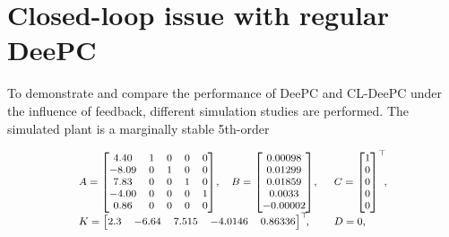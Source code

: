 \section{Closed-loop issue with regular \ac{DeePC}}\label{sec:CL_ID_issue}
To demonstrate and compare the performance of \ac{DeePC} and \ac{CL-DeePC} under the influence of feedback, different simulation studies are performed. The simulated plant is a marginally stable 5th-order 

\begin{align}\label{eq:SysFavoreel}
\scriptsize
\begin{array}{lll}
    A = \begin{bmatrix}
        4.40 & 1 & 0 & 0 & 0\\
       -8.09 & 0 & 1 & 0 & 0\\
        7.83 & 0 & 0 & 1 & 0\\
       -4.00 & 0 & 0 & 0 & 1\\
        0.86 & 0 & 0 & 0 & 0
    \end{bmatrix}\!,&
    B = \begin{bmatrix}
        0.00098\\
        0.01299\\
        0.01859\\
        0.0033\\
       -0.00002
    \end{bmatrix}\!,&C = \begin{bmatrix}
        1 \\ 0 \\ 0\\ 0\\ 0
    \end{bmatrix}^\top\mkern-7mu,\\
    K = \begin{bmatrix}
        2.3 & -6.64 & 7.515 & -4.0146 & 0.86336
    \end{bmatrix}^\top\mkern-7mu,\span
    &D=0,
\end{array}
\end{align}

